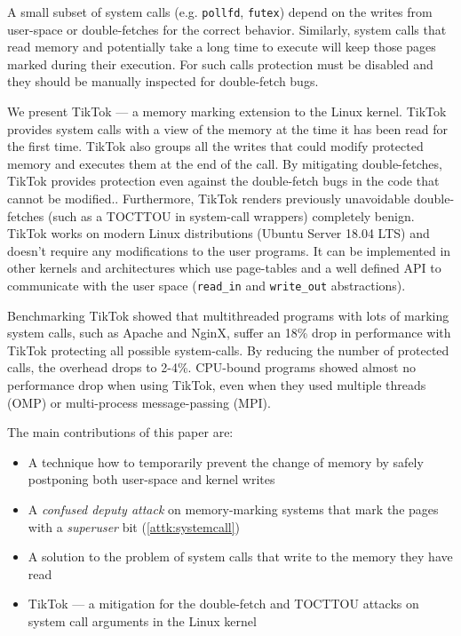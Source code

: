 \documentclass[conference]{IEEEtran}
\newcommand{\mat}[1]{\textcolor{red}{\textbf{Mat:} #1}}
\newcommand{\sysname}{TikTok}
\newcommand{\roughevaloverheadbad}{18\%}
\newcommand{\roughevaloverheadbetter}{2-4\%}
\begin{document}
A small subset of system calls (e.g. \texttt{pollfd}, \texttt{futex})
depend on the writes from user-space or double-fetches for the correct behavior.
Similarly, system calls that read memory and potentially take a long time to
execute will keep those pages marked during their execution. For such calls
protection must be disabled and they should be manually inspected for
double-fetch bugs.


We present \sysname{} --- a memory marking extension to the Linux kernel.
\sysname{} provides system calls with a view of the memory at the time it has
been read for the first time. \sysname{} also groups all the writes that could
modify protected memory and executes them at the end of the call. By mitigating
double-fetches, \sysname{} provides protection even against the double-fetch
bugs in the code that cannot be modified.. Furthermore, \sysname{} renders
previously unavoidable double-fetches (such as a TOCTTOU in system-call
wrappers) completely benign. \sysname{} works on modern Linux distributions
(Ubuntu Server 18.04 LTS) and doesn't require any modifications to the user
programs. It can be implemented in other kernels and architectures which use
page-tables and a well defined API to communicate with the user space
(\texttt{read\_in} and \texttt{write\_out} abstractions).


Benchmarking \sysname{} showed that multithreaded programs with lots of marking
system calls, such as Apache and NginX, suffer an \roughevaloverheadbad{} drop in
performance with \sysname{} protecting all possible system-calls. By reducing
the number of protected calls, the overhead drops to \roughevaloverheadbetter{}.
CPU-bound programs showed almost no performance drop when using \sysname{}, even
when they used multiple threads (OMP) or multi-process message-passing (MPI).



The main contributions of this paper are:

\begin{itemize}
\item A technique how to temporarily prevent the change of memory by safely
      postponing both user-space and kernel writes
\item A \emph{confused deputy attack} on memory-marking systems that mark the pages with a \emph{superuser} bit (\autoref{attk:systemcall})
\item A solution to the problem of system calls that write to the memory they have read
\item \sysname{} --- a mitigation for the double-fetch and TOCTTOU attacks on system
      call arguments in the Linux kernel
\end{itemize}
\end{document}
